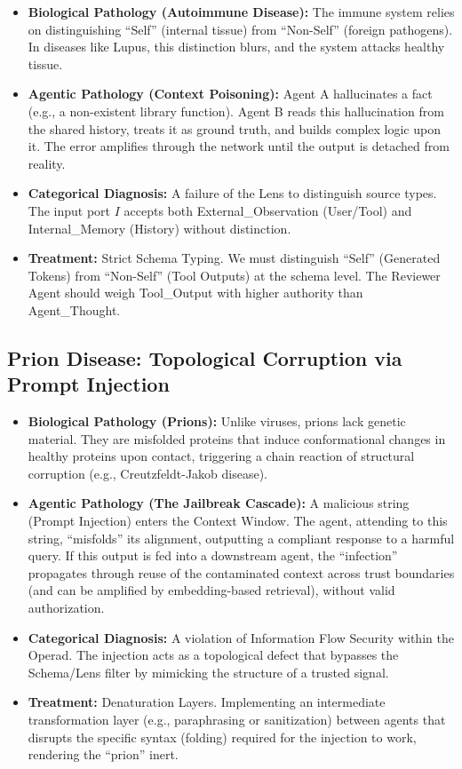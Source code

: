\begin{itemize}[leftmargin=*]
\item \textbf{Biological Pathology (Autoimmune Disease):} The immune system relies on distinguishing ``Self''
(internal tissue) from ``Non-Self'' (foreign pathogens). In diseases like Lupus, this distinction blurs, and the
system attacks healthy tissue.
\item \textbf{Agentic Pathology (Context Poisoning):} Agent A hallucinates a fact (e.g., a non-existent library
function). Agent B reads this hallucination from the shared history, treats it as ground truth, and builds
complex logic upon it. The error amplifies through the network until the output is detached from reality.
\item \textbf{Categorical Diagnosis:} A failure of the Lens to distinguish source types. The input port $I$
accepts both External\_Observation (User/Tool) and Internal\_Memory (History) without distinction.
\item \textbf{Treatment:} Strict Schema Typing. We must distinguish ``Self'' (Generated Tokens) from ``Non-Self''
(Tool Outputs) at the schema level. The Reviewer Agent should weigh Tool\_Output with higher authority than
Agent\_Thought.
\end{itemize}

\subsection{Prion Disease: Topological Corruption via Prompt Injection}

\begin{itemize}[leftmargin=*]
\item \textbf{Biological Pathology (Prions):} Unlike viruses, prions lack genetic material. They are misfolded
proteins that induce conformational changes in healthy proteins upon contact, triggering a chain reaction of
structural corruption (e.g., Creutzfeldt-Jakob disease).
\item \textbf{Agentic Pathology (The Jailbreak Cascade):} A malicious string (Prompt Injection) enters the
Context Window. The agent, attending to this string, ``misfolds'' its alignment, outputting a compliant response
to a harmful query. If this output is fed into a downstream agent, the ``infection'' propagates through reuse of
the contaminated context across trust boundaries (and can be amplified by embedding-based retrieval), without
valid authorization.
\item \textbf{Categorical Diagnosis:} A violation of Information Flow Security within the Operad. The injection
acts as a topological defect that bypasses the Schema/Lens filter by mimicking the structure of a trusted signal.
\item \textbf{Treatment:} Denaturation Layers. Implementing an intermediate transformation layer (e.g.,
paraphrasing or sanitization) between agents that disrupts the specific syntax (folding) required for the
injection to work, rendering the ``prion'' inert.
\end{itemize}


